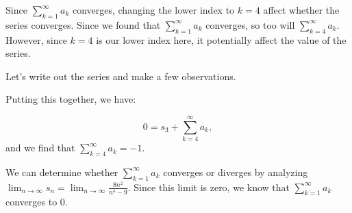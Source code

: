 \documentclass{ximera}
\begin{document}
\begin{example}
\begin{question}
\begin{explanation}
Since $\sum_{k=1}^{\infty} a_k$ converges, changing the lower index to $k=4$   affect whether the series converges.  Since we found that $\sum_{k=1}^{\infty} a_k$ converges, so too will $\sum_{k=4}^{\infty} a_k$.  However, since $k=4$ is our lower index here, it  potentially affect the value of the series.

Let's write out the series and make a few observations.

\begin{image}
  \end{image}
  
 Putting this together, we have:
 
 \[
 0 = s_3 + \sum_{k=4}^{\infty} a_k,
 \] 
 and we find that $ \sum_{k=4}^{\infty} a_k = -1$. 

We can determine whether $\sum_{k=1}^{\infty} a_k$ converges or diverges by analyzing $\lim_{n \to \infty} s_n = \lim_{n \to \infty} \frac{8n^2}{n^4-9}$.  Since this limit is zero, we know that $\sum_{k=1}^{\infty} a_k$ converges to $0$.
\end{explanation}
\end{question}

\end{example}
\end{document}
